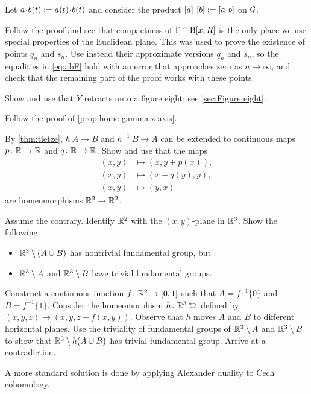 Let $a\cdot b(t)\df a(t)\cdot b(t)$ and consider the product $[a]\cdot [b]\df[a\cdot b]$ on $\tilde{\mathcal{G}}$.

Follow the proof and see that compactness of $\Gamma\cap \bar{\mathrm{B}}[x,R]$ is the only place we use special properties of the Euclidean plane.
This was used to prove the existence of points $q_n$ and $s_n$.
Use instead their approximate versions $\tilde q_n$ and $\tilde s_n$, so the equalities in \ref{eq:abF} hold with an error that approaches zero as $n\to\infty$, and check that the remaining part of the proof works with these points.

Show and use that $Y$ retracts onto a figure eight; see \ref{sec:Figure eight}.

Follow the proof of \ref{prop:home-gamma-z-axis}.

By \ref{thm:tietze}, $h\:A\to B$ and $h^{-1}\:B\to A$ can be extended to continuous maps $p\colon\mathbb{R}\to\mathbb{R}$ and $q\colon\mathbb{R}\to\mathbb{R}$.
Show and use that the maps
\begin{align*}
(x,y)&\mapsto (x,y+p(x)),
\\
(x,y)&\mapsto (x-q(y),y),
\\
(x,y)&\mapsto(y,x)
\end{align*}
are homeomorphisms $\mathbb{R}^2\to\mathbb{R}^2$.


Assume the contrary.
Identify $\mathbb{R}^2$ with the $(x,y)$-plane in $\mathbb{R}^3$.
Show the following:
\begin{itemize}
 \item $\mathbb{R}^3\setminus(A\cup B)$ has nontrivial fundamental group, but
 \item $\mathbb{R}^3\setminus A$ and $\mathbb{R}^3\setminus B$ have trivial fundamental groups.
\end{itemize}

Construct a continuous function $f\:\RR^2\z\to[0,1]$ such that $A=f^{-1}\{0\}$ and $B=f^{-1}\{1\}$.
Consider the homeomorphism $h\:\RR^3\selfup$ defined by $(x,y,z)\mapsto (x,y,z+f(x,y))$.
Observe that $h$ moves $A$ and $B$ to different horizontal planes.
Use the triviality of fundamental groups of $\mathbb{R}^3\setminus A$ and $\mathbb{R}^3\setminus B$ to show that
$\mathbb{R}^3\setminus h(A\cup B)$ has trivial fundamental group.
Arrive at a contradiction.

A more standard solution is done by applying Alexander duality to Čech cohomology.

